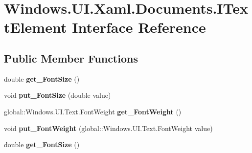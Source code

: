 \hypertarget{interface_windows_1_1_u_i_1_1_xaml_1_1_documents_1_1_i_text_element}{}\section{Windows.\+U\+I.\+Xaml.\+Documents.\+I\+Text\+Element Interface Reference}
\label{interface_windows_1_1_u_i_1_1_xaml_1_1_documents_1_1_i_text_element}
\subsection*{Public Member Functions}
\begin{DoxyCompactItemize}
\item 
\mbox{\label{interface_windows_1_1_u_i_1_1_xaml_1_1_documents_1_1_i_text_element_a2628455fb9bb6efd33aeb10bc4eb2db6}} 
double {\bfseries get\+\_\+\+Font\+Size} ()
\item 
\mbox{\label{interface_windows_1_1_u_i_1_1_xaml_1_1_documents_1_1_i_text_element_ab395151986a4eeb5ac6b9da03aa657b6}} 
void {\bfseries put\+\_\+\+Font\+Size} (double value)
\item 
\mbox{\label{interface_windows_1_1_u_i_1_1_xaml_1_1_documents_1_1_i_text_element_ab64a17e34aa47f76baa256e8b2ca584c}} 
global\+::\+Windows.\+U\+I.\+Text.\+Font\+Weight {\bfseries get\+\_\+\+Font\+Weight} ()
\item 
\mbox{\label{interface_windows_1_1_u_i_1_1_xaml_1_1_documents_1_1_i_text_element_a7ddd886d00bf098a3cf281d8c898aefb}} 
void {\bfseries put\+\_\+\+Font\+Weight} (global\+::\+Windows.\+U\+I.\+Text.\+Font\+Weight value)
\item 
\mbox{\label{interface_windows_1_1_u_i_1_1_xaml_1_1_documents_1_1_i_text_element_a2628455fb9bb6efd33aeb10bc4eb2db6}} 
double {\bfseries get\+\_\+\+Font\+Size} ()
\item 
\mbox{\label{interface_windows_1_1_u_i_1_1_xaml_1_1_documents_1_1_i_text_element_ab395151986a4eeb5ac6b9da03aa657b6}} 

\end{DoxyCompactItemize}
